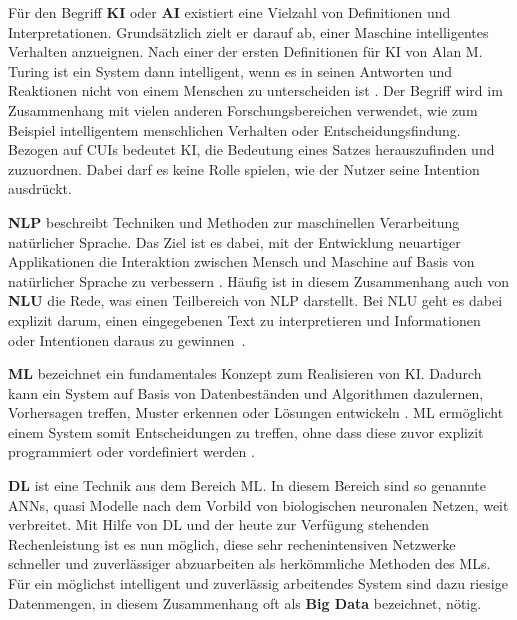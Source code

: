 Für den Begriff \textbf{\ac{KI}} oder \textbf{\ac{AI}} existiert eine Vielzahl von Definitionen und Interpretationen. Grundsätzlich zielt er darauf ab, einer Maschine intelligentes Verhalten anzueignen. Nach einer der ersten Definitionen für \ac{KI} von Alan M. Turing ist ein System dann intelligent, wenn es in seinen Antworten und Reaktionen nicht von einem Menschen zu unterscheiden ist \cite[S. 237]{nahrstedt_algorithmen_2012}. Der Begriff wird im Zusammenhang mit vielen anderen Forschungsbereichen verwendet, wie zum Beispiel intelligentem menschlichen Verhalten oder Entscheidungsfindung. Bezogen auf \aclp{CUI} bedeutet \acl{KI}, die Bedeutung eines Satzes herauszufinden und zuzuordnen. Dabei darf es keine Rolle spielen, wie der Nutzer seine Intention ausdrückt. \cite[S. 52]{nishith_pathak_artificial_2017}

\textbf{\ac{NLP}} beschreibt Techniken und Methoden zur maschinellen Verarbeitung natürlicher Sprache. Das Ziel ist es dabei, mit der Entwicklung neuartiger Applikationen die Interaktion zwischen Mensch und Maschine auf Basis von natürlicher Sprache zu verbessern \cite[S. 1]{deng_deep_2018}. Häufig ist in diesem Zusammenhang auch von \textbf{\ac{NLU}} die Rede, was einen Teilbereich von \ac{NLP} darstellt. Bei \ac{NLU} geht es dabei explizit darum, einen eingegebenen Text zu interpretieren und Informationen oder Intentionen daraus zu \mbox{gewinnen \cite[S. 15]{ovchinnikova_integration_2012}}.

\textbf{\ac{ML}} bezeichnet ein fundamentales Konzept zum Realisieren von \ac{KI}. Dadurch kann ein System auf Basis von Datenbeständen und Algorithmen  dazulernen, Vorhersagen treffen, Muster erkennen oder Lösungen entwickeln \cite[S. 9]{nishith_pathak_artificial_2017}. \ac{ML} ermöglicht einem System somit Entscheidungen zu treffen, ohne dass diese zuvor explizit programmiert oder vordefiniert werden \cite[S. 187]{mitrevski_developing_2018}. 

\textbf{\ac{DL}} ist eine Technik aus dem Bereich \acl{ML}. In diesem Bereich sind so genannte \acp{ANN}, quasi Modelle nach dem Vorbild von biologischen neuronalen Netzen, weit verbreitet. Mit Hilfe von \ac{DL} und der heute zur Verfügung stehenden Rechenleistung ist es nun möglich, diese sehr rechenintensiven Netzwerke schneller und zuverlässiger abzuarbeiten als herkömmliche Methoden des \aclp{ML}. Für ein möglichst intelligent und zuverlässig arbeitendes System sind dazu riesige Datenmengen, in diesem Zusammenhang oft als \textbf{Big Data} bezeichnet, nötig. \cite[S. 9]{nishith_pathak_artificial_2017}\cite[S. 9-10]{vieira_introduction_2018}

